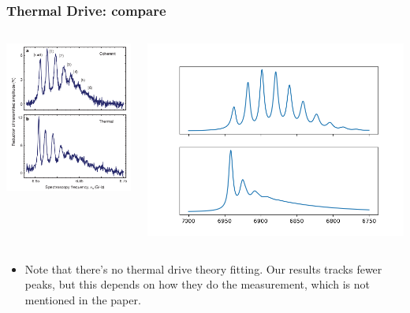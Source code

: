 \documentclass[xcolor=dvipsnames,hyperref={CJKbookmarks=true},aspectratio=169]{beamer}
\begin{document}
\begin{frame}[t]\frametitle{Thermal Drive: compare}
\begin{columns}
\begin{column}{0.4\linewidth}
    \centering
    \includegraphics[width=0.8\linewidth]{thermal_origin.png}
\end{column}%
\begin{column}{0.6\linewidth}
	\centering
    \includegraphics[width=0.9\linewidth]{thermal.png}
\end{column}
\end{columns}
\begin{itemize}
	\item Note that there's no thermal drive theory fitting. 
	Our results tracks fewer peaks, but this depends on 
	how they do the measurement, which is not mentioned in the paper. 
\end{itemize}
\end{frame}
\end{document}
